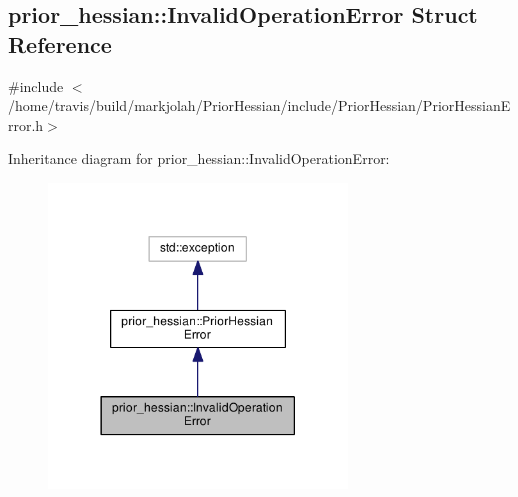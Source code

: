 \hypertarget{structprior__hessian_1_1InvalidOperationError}{}\subsection{prior\+\_\+hessian\+:\+:Invalid\+Operation\+Error Struct Reference}
\label{structprior__hessian_1_1InvalidOperationError}


{\ttfamily \#include $<$/home/travis/build/markjolah/\+Prior\+Hessian/include/\+Prior\+Hessian/\+Prior\+Hessian\+Error.\+h$>$}



Inheritance diagram for prior\+\_\+hessian\+:\+:Invalid\+Operation\+Error\+:\nopagebreak
\begin{figure}[H]
\begin{center}
\leavevmode
\includegraphics[width=225pt]{structprior__hessian_1_1InvalidOperationError__inherit__graph}
\end{center}
\end{figure}


